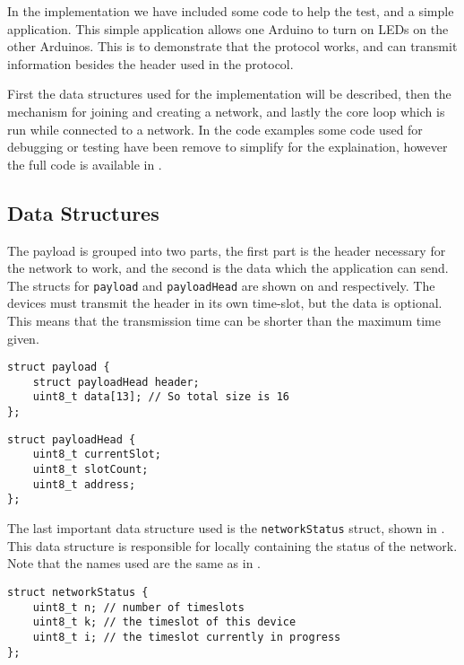 In the implementation we have included some code to help the test, and a simple application. 
This simple application allows one Arduino to turn on LEDs on the other Arduinos. 
This is to demonstrate that the protocol works, and can transmit information besides the header used in the protocol. 

First the data structures used for the implementation will be described, then the mechanism for joining and creating a network, and lastly the core loop which is run while connected to a network.
In the code examples some code used for debugging or testing have been remove to simplify for the explaination, however the full code is available in . 
\subsection{Data Structures}
The payload is grouped into two parts, the first part is the header necessary for the network to work, and the second is the data which the application can send.
The structs for \texttt{payload} and \texttt{payloadHead} are shown on  and  respectively.
The devices must transmit the header in its own time-slot, but the data is optional.
This means that the transmission time can be shorter than the maximum time given.

\begin{lstlisting}[style=customc,caption={The payload the network uses.},label={lst:ccrc:payload}]
struct payload {
    struct payloadHead header;
    uint8_t data[13]; // So total size is 16
};
\end{lstlisting}

\begin{lstlisting}[style=customc,caption={The header of the payload which the network uses.},label={lst:ccrc:payloadHead}]
struct payloadHead {
    uint8_t currentSlot;
    uint8_t slotCount;
    uint8_t address;
};
\end{lstlisting}

The last important data structure used is the \texttt{networkStatus} struct, shown in .
This data structure is responsible for locally containing the status of the network. 
Note that the names used are the same as in .

\begin{lstlisting}[style=customc,caption={The \texttt{networkStatus} struct, containing the status of the network locally.},label={lst:ccrc:networkStatus}]
struct networkStatus {
    uint8_t n; // number of timeslots
    uint8_t k; // the timeslot of this device
    uint8_t i; // the timeslot currently in progress
};
\end{lstlisting}

